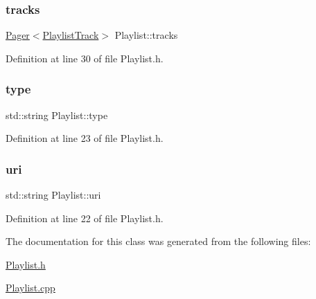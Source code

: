 \subsubsection{\texorpdfstring{tracks}{tracks}}
{\footnotesize\ttfamily \mbox{\hyperlink{class_pager}{Pager}}$<$\mbox{\hyperlink{class_playlist_track}{Playlist\+Track}}$>$ Playlist\+::tracks\hspace{0.3cm}{\ttfamily [private]}}



Definition at line 30 of file Playlist.\+h.

\mbox{\label{class_playlist_a0167a906001dfd15fe84df3f7fdb370d}} 
\subsubsection{\texorpdfstring{type}{type}}
{\footnotesize\ttfamily std\+::string Playlist\+::type\hspace{0.3cm}{\ttfamily [private]}}



Definition at line 23 of file Playlist.\+h.

\mbox{\label{class_playlist_a9b0edc762375b2c55ece8941aff077e4}} 
\subsubsection{\texorpdfstring{uri}{uri}}
{\footnotesize\ttfamily std\+::string Playlist\+::uri\hspace{0.3cm}{\ttfamily [private]}}



Definition at line 22 of file Playlist.\+h.



The documentation for this class was generated from the following files\+:\begin{DoxyCompactItemize}
\item 
\mbox{\hyperlink{_playlist_8h}{Playlist.\+h}}\item 
\mbox{\hyperlink{_playlist_8cpp}{Playlist.\+cpp}}\end{DoxyCompactItemize}
